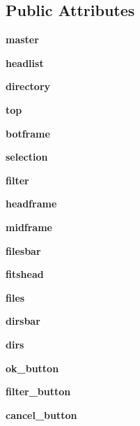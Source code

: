 \subsection*{Public Attributes}
\begin{CompactItemize}
\item 
\textbf{master}\label{classmyDialog_1_1FITSFileDialog_0632550abb19c47d1b57b5268302baa2}

\item 
\textbf{headlist}\label{classmyDialog_1_1FITSFileDialog_271e24ddc334d60faf1a54081bdece81}

\item 
\textbf{directory}\label{classmyDialog_1_1FITSFileDialog_c63e2ad11ee07431173d67dafd6de731}

\item 
\textbf{top}\label{classmyDialog_1_1FITSFileDialog_ad0afb327c7e622f251be0d87ff8635b}

\item 
\textbf{botframe}\label{classmyDialog_1_1FITSFileDialog_8483d9938a0bf008c6a00eb4715b863c}

\item 
\textbf{selection}\label{classmyDialog_1_1FITSFileDialog_19e7d369b20201cdf921359602d8eca9}

\item 
\textbf{filter}\label{classmyDialog_1_1FITSFileDialog_8bbaba2dd70ceb27c91ef2f964eb77b6}

\item 
\textbf{headframe}\label{classmyDialog_1_1FITSFileDialog_4a6db8d5845fc174a646c0660284847e}

\item 
\textbf{midframe}\label{classmyDialog_1_1FITSFileDialog_ba10c982ac6f1c3af0f13de4fcb0b52b}

\item 
\textbf{filesbar}\label{classmyDialog_1_1FITSFileDialog_1642a44f454b538ff89e4d4c5f33f1e7}

\item 
\textbf{fitshead}\label{classmyDialog_1_1FITSFileDialog_b18a5f7aec3d67af908e8f6e6fb94853}

\item 
\textbf{files}\label{classmyDialog_1_1FITSFileDialog_989f422c2c1aae114210b1cc6d6e2dc8}

\item 
\textbf{dirsbar}\label{classmyDialog_1_1FITSFileDialog_566747fe02a1984d8719bcfecd0db366}

\item 
\textbf{dirs}\label{classmyDialog_1_1FITSFileDialog_58258ce82407b8edbb6df5b69955750e}

\item 
\textbf{ok\_\-button}\label{classmyDialog_1_1FITSFileDialog_63818c1e4b69b2177b09bd0d6f907595}

\item 
\textbf{filter\_\-button}\label{classmyDialog_1_1FITSFileDialog_d21db7924b8b8583c8bc7cbd274fa455}

\item 
\textbf{cancel\_\-button}\label{classmyDialog_1_1FITSFileDialog_017013b3fa516cf7eb9c6fa05200f617}

\end{CompactItemize}


